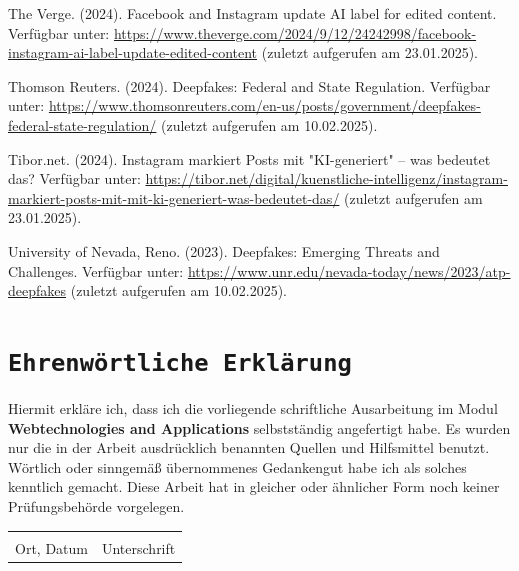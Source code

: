 \documentclass[a4paper,12pt]{article}
\begin{document}
\begin{thebibliography}{99}
 The Verge. (2024). Facebook and Instagram update AI label for edited content. 
Verfügbar unter: \url{https://www.theverge.com/2024/9/12/24242998/facebook-instagram-ai-label-update-edited-content} (zuletzt aufgerufen am 23.01.2025).

 Thomson Reuters. (2024). Deepfakes: Federal and State Regulation.  
Verfügbar unter: \url{https://www.thomsonreuters.com/en-us/posts/government/deepfakes-federal-state-regulation/} (zuletzt aufgerufen am 10.02.2025).

 Tibor.net. (2024). Instagram markiert Posts mit "KI-generiert" – was bedeutet das? 
Verfügbar unter: \url{https://tibor.net/digital/kuenstliche-intelligenz/instagram-markiert-posts-mit-mit-ki-generiert-was-bedeutet-das/} (zuletzt aufgerufen am 23.01.2025).

 University of Nevada, Reno. (2023). Deepfakes: Emerging Threats and Challenges.
Verfügbar unter: \url{https://www.unr.edu/nevada-today/news/2023/atp-deepfakes} (zuletzt aufgerufen am 10.02.2025).
\end{thebibliography}
\newpage

\newpage
\section*{\texttt{Ehrenwörtliche Erklärung}}
Hiermit erkläre ich, dass ich die vorliegende schriftliche Ausarbeitung im Modul \textbf{Webtechnologies and Applications} selbstständig
angefertigt habe. Es wurden nur die in der Arbeit ausdrücklich benannten Quellen und
Hilfsmittel benutzt. Wörtlich oder sinngemäß übernommenes Gedankengut habe ich als
solches kenntlich gemacht. Diese Arbeit hat in gleicher oder ähnlicher Form noch keiner
Prüfungsbehörde vorgelegen.

\vspace{3cm}
\noindent\begin{tabular}{p{}p{}}
    \hrulefill & \hrulefill \\
    Ort, Datum & Unterschrift \\
\end{tabular}
\end{document}

